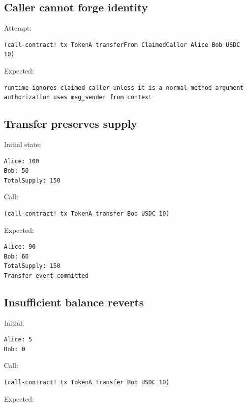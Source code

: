 \documentclass[11pt]{article}
\begin{document}
\subsection{Caller cannot forge identity}

Attempt:

\begin{lstlisting}
(call-contract! tx TokenA transferFrom ClaimedCaller Alice Bob USDC 10)
\end{lstlisting}

Expected:

\begin{lstlisting}
runtime ignores claimed caller unless it is a normal method argument
authorization uses msg_sender from context
\end{lstlisting}

\subsection{Transfer preserves supply}

Initial state:

\begin{lstlisting}
Alice: 100
Bob: 50
TotalSupply: 150
\end{lstlisting}

Call:

\begin{lstlisting}
(call-contract! tx TokenA transfer Bob USDC 10)
\end{lstlisting}

Expected:

\begin{lstlisting}
Alice: 90
Bob: 60
TotalSupply: 150
Transfer event committed
\end{lstlisting}

\subsection{Insufficient balance reverts}

Initial:

\begin{lstlisting}
Alice: 5
Bob: 0
\end{lstlisting}

Call:

\begin{lstlisting}
(call-contract! tx TokenA transfer Bob USDC 10)
\end{lstlisting}

Expected:
\end{document}
